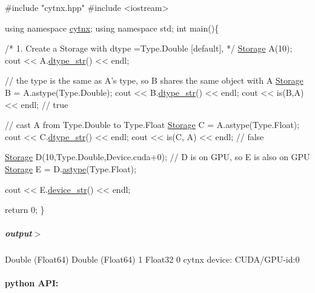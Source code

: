 \begin{DoxyCodeInclude}
\textcolor{preprocessor}{#include "cytnx.hpp"}
\textcolor{preprocessor}{#include <iostream>}


\textcolor{keyword}{using namespace }\hyperlink{namespacecytnx}{cytnx};
\textcolor{keyword}{using namespace }std;
\textcolor{keywordtype}{int} main()\{ 

    \textcolor{comment}{/*}
\textcolor{comment}{        1. Create a Storage with }
\textcolor{comment}{        dtype =Type.Double [default],}
\textcolor{comment}{    */}
    \hyperlink{classcytnx_1_1Storage}{Storage} A(10);
    cout << A.\hyperlink{classcytnx_1_1Tensor_a9e09106c7529e8be90caa52e1541e498}{dtype\_str}() << endl;

    \textcolor{comment}{// the type is the same as A's type, so B shares the same object with A}
    \hyperlink{classcytnx_1_1Storage}{Storage} B = A.astype(Type.Double); 
    cout << B.\hyperlink{classcytnx_1_1Storage_ab6e9fb01ad4655701a2d54dc978eef17}{dtype\_str}() << endl;
    cout << is(B,A) << endl; \textcolor{comment}{// true}

    \textcolor{comment}{// cast A from Type.Double to Type.Float}
    \hyperlink{classcytnx_1_1Storage}{Storage} C = A.astype(Type.Float);
    cout << C.\hyperlink{classcytnx_1_1Storage_ab6e9fb01ad4655701a2d54dc978eef17}{dtype\_str}() << endl;
    cout << is(C, A) << endl; \textcolor{comment}{// false}


    \hyperlink{classcytnx_1_1Storage}{Storage} D(10,Type.Double,Device.cuda+0);
    \textcolor{comment}{// D is on GPU, so E is also on GPU}
    \hyperlink{classcytnx_1_1Storage}{Storage} E = D.\hyperlink{classcytnx_1_1Storage_a8310d8dbb70510272ded2e3d01be25f0}{astype}(Type.Float);

    cout << E.\hyperlink{classcytnx_1_1Storage_ae0d90d5275fa7e52a0a2dc10512ba71f}{device\_str}() << endl; 

 

    \textcolor{keywordflow}{return} 0;
\}

\end{DoxyCodeInclude}
 \subparagraph*{output$>$}


\begin{DoxyVerbInclude}
Double (Float64)
Double (Float64)
1
Float32
0
cytnx device: CUDA/GPU-id:0
\end{DoxyVerbInclude}
 \paragraph*{python A\+PI\+:}


